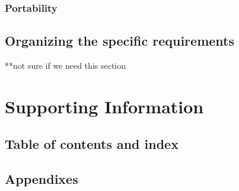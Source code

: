 \documentclass[letterpaper,10pt,draftclsnofoot,onecolumn,titlepage]{IEEEtran}
\begin{document}
	\subsubsection{Portability}

	\subsection{Organizing the specific requirements}
	**not sure if we need this section

	\section{Supporting Information}
	\subsection{Table of contents and index}
	\subsection{Appendixes}
\end{document}
